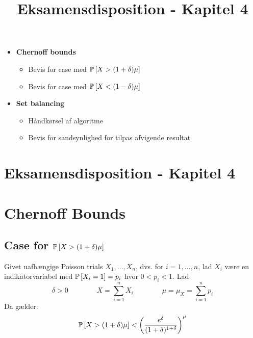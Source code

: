 
\title{Eksamensdisposition - Kapitel 4}


\maketitle

\begin{itemize}
\item \textbf{Chernoff bounds}
\begin{itemize}
  \item Bevis for case med $\P{X > (1 + \delta) \mu}$
  \item Bevis for case med $\P{X < (1 - \delta) \mu}$
\end{itemize}

\item \textbf{Set balancing}
\begin{itemize}
  \item Håndkørsel af algoritme
  \item Bevis for sandsynlighed for tilpas afvigende resultat
\end{itemize}
\end{itemize}


\newpage
\section{Eksamensdisposition - Kapitel 4}

\section{Chernoff Bounds}
\subsection{Case for $\P{X > (1 + \delta) \mu}$}
Givet uafhængige Poisson trials $X_1, \dots, X_n$, dvs. for $i = 1, \dots, n$, lad $X_i$ være en indikatorvariabel med $\P{X_i = 1} = p_i$ hvor $0 < p_i < 1$. Lad
$$
\delta > 0
\quad\quad\quad\quad
X = \sum_{i=1}^n X_i
\quad\quad\quad\quad
\mu = \mu_X = \sum_{i=1}^n p_i
$$
Da gælder:
\begin{align*}
  \P{X > (1+\delta) \mu} < \pfrac{e^\delta}{(1+\delta)^{1 + \delta}}^\mu
\end{align*}


